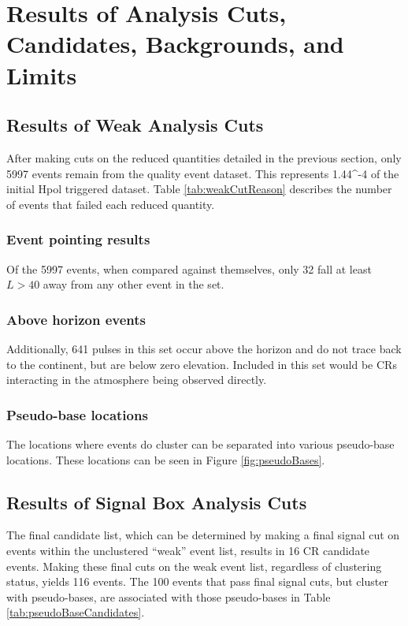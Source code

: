 			
\chapter{Results of Analysis Cuts, Candidates, Backgrounds, and Limits}


\section{Results of Weak Analysis Cuts}
		After making cuts on the reduced quantities detailed in the previous section, only 5997 events remain from the quality event dataset.  This represents 1.44^{-4} of the initial Hpol triggered dataset.  Table \ref{tab:weakCutReason} describes the number of events that failed each reduced quantity.

	\subsection{Event pointing results}
		Of the 5997 events, when compared against themselves, only 32 fall at least $L>40$ away from any other event in the set.
	
	\subsection{Above horizon events}
		Additionally, 641 pulses in this set occur above the horizon and do not trace back to the continent, but are below zero elevation.  Included in this set would be CRs interacting in the atmosphere being observed directly.
		

	\subsection{Pseudo-base locations}
		The locations where events do cluster can be separated into various pseudo-base locations.  These locations can be seen in Figure \ref{fig:pseudoBases}.

\section{Results of Signal Box Analysis Cuts}
		The final candidate list, which can be determined by making a final signal cut on events within the unclustered ``weak'' event list, results in 16 CR candidate events.  Making these final cuts on the weak event list, regardless of clustering status, yields 116 events.  The 100 events that pass final signal cuts, but cluster with pseudo-bases, are associated with those pseudo-bases in Table \ref{tab:pseudoBaseCandidates}.
		
